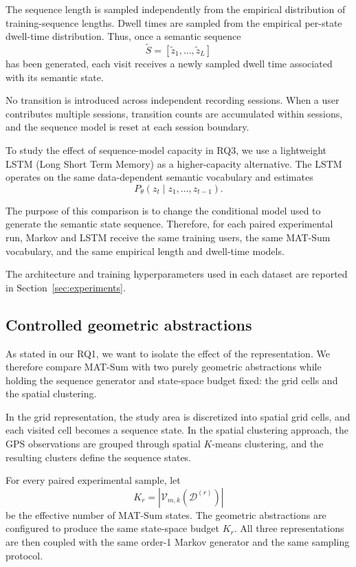 \documentclass[sigconf,nonacm]{acmart}
\begin{document}
The sequence length is sampled independently from the empirical distribution of training-sequence lengths. Dwell times are sampled from the empirical per-state dwell-time distribution. Thus, once a semantic sequence
%
\[
    \widetilde{S}
    =
    [\tilde z_1,\ldots,\tilde z_L]
\]
%
has been generated, each visit receives a newly sampled dwell time associated with its semantic state.

No transition is introduced across independent recording sessions. When a user contributes multiple sessions, transition counts are accumulated within sessions, and the sequence model is reset at each session boundary.

To study the effect of sequence-model capacity in RQ3, we use a lightweight LSTM (Long Short Term Memory) as a higher-capacity alternative. The LSTM operates on
the same data-dependent semantic vocabulary and estimates
%
\[
    P_{\theta}
    (z_t \mid z_1,\ldots,z_{t-1}).
\]

The purpose of this comparison is to change the conditional model used to generate the semantic state sequence. Therefore, for each paired experimental run, Markov and LSTM receive the same training users, the same MAT-Sum vocabulary, and the same empirical length and dwell-time models.

The architecture and training hyperparameters used in each dataset are reported in Section~\ref{sec:experiments}.


\subsection{Controlled geometric abstractions}
\label{sec:baselines}

As stated in our RQ1, we want to isolate the effect of the representation. We therefore compare
MAT-Sum with two purely geometric abstractions while holding the sequence generator and state-space budget fixed: the grid cells and the spatial clustering. 

In the grid representation, the study area is discretized into spatial grid cells, and each visited cell becomes a sequence state.
In the spatial clustering approach, the GPS observations are grouped through spatial $K$-means clustering, and the resulting clusters define the sequence states.

For every paired experimental sample, let
%
\[
    K_r
    =
    |\mathcal{V}_{m,k}(\mathcal{D}^{(r)})|
\]
%
be the effective number of MAT-Sum states. The geometric abstractions are configured to produce the same state-space budget $K_r$.
All three representations are then coupled with the same order-1 Markov generator and the same sampling protocol.
\end{document}
